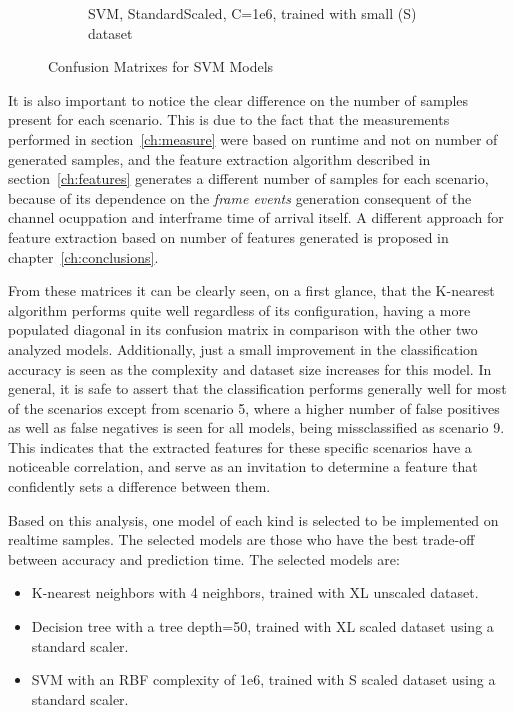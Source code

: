 \begin{figure}[!htb]
\begin{subfigure}[htb]{0.49\textwidth}
        \caption{\ac{SVM}, StandardScaled, C=1e6, trained with small (S) dataset}
        \label{fig:knn_4}
    \end{subfigure}
    \caption{Confusion Matrixes for \ac{SVM} Models}
    \label{fig:confusionsvc}
\end{figure}
It is also important to notice the clear difference on the number of samples present for each scenario. This is due to the fact that the measurements performed in section~\ref{ch:measure} were based on runtime and not on number of generated samples, and the feature extraction algorithm described in section~\ref{ch:features} generates a different number of samples for each scenario, because of its dependence on the \emph{frame events} generation consequent of the channel ocuppation and interframe time of arrival itself. A different approach for feature extraction based on number of features generated is proposed in chapter~\ref{ch:conclusions}.

From these matrices it can be clearly seen, on a first glance, that the K-nearest algorithm performs quite well regardless of its configuration, having a more populated diagonal in its confusion matrix in comparison with the other two analyzed models. Additionally, just a small improvement in the classification accuracy is seen as the complexity and dataset size increases for this model. In general, it is safe to assert that the classification performs generally well for most of the scenarios except from scenario 5, where a higher number of false positives as well as false negatives is seen for all models, being missclassified as scenario 9. This indicates that the extracted features for these specific scenarios have a noticeable correlation, and serve as an invitation to determine a feature that confidently sets a difference between them.

Based on this analysis, one model of each kind is selected to be implemented on realtime samples. The selected models are those who have the best trade-off between accuracy and prediction time. The selected models are:

\begin{itemize}
    \item K-nearest neighbors with 4 neighbors, trained with XL unscaled dataset.
    \item Decision tree with a tree depth=50, trained with XL scaled dataset using a standard scaler.
    \item \ac{SVM} with an RBF complexity of 1e6, trained with S  scaled dataset using a standard scaler.
\end{itemize}


